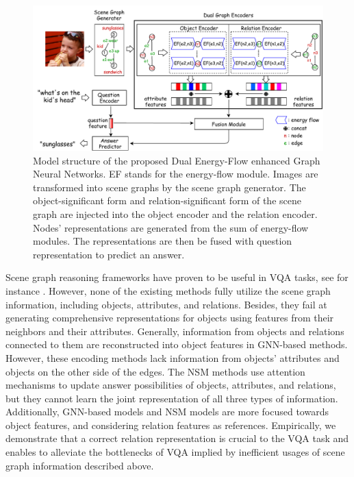 \documentclass[letterpaper]{article} %
\begin{document}
\begin{figure}[ht] 
    \centering 
    \includegraphics[width=1.0\textwidth]{./pic/DE-GNN2.pdf} 
    \caption{Model structure of the proposed Dual Energy-Flow enhanced Graph Neural Networks. EF stands for the energy-flow module. Images are transformed into scene graphs by the scene graph generator. The object-significant form and relation-significant form of the scene graph are injected into the object encoder and the relation encoder. Nodes' representations are generated from the sum of energy-flow modules. The representations are then be fused with question representation to predict an answer.} 
    \label{fig2} 
\end{figure}


Scene graph reasoning frameworks have proven to be useful in VQA tasks, see for instance \cite{johnson2015image,DBLP:journals/corr/abs-2007-01072,yang2020prior}. 
However, none of the existing methods fully utilize the scene graph information, including objects, attributes, and relations.
Besides, they fail at generating comprehensive representations for objects using features from their neighbors and their attributes. 
Generally, information from objects and relations connected to them are reconstructed into object features in GNN-based methods.
However, these encoding methods lack information from objects' attributes and objects on the other side of the edges. 
The NSM methods use attention mechanisms to update answer possibilities of objects, attributes, and relations, but they cannot learn the joint representation of all three types of information. 
Additionally, GNN-based models and NSM models are more focused towards object features, and considering relation features as references. 
Empirically, we demonstrate that a correct relation representation is crucial to the VQA task and enables to alleviate the bottlenecks of VQA implied by inefficient usages of scene graph information described above.
\end{document}
